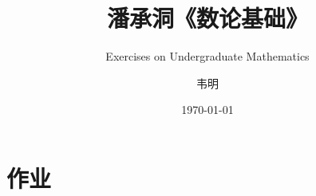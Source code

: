 \documentclass[12pt,lang=cn,thmcnt=subsection,pad]{elegantbook}
\title{潘承洞《数论基础》}
\subtitle{Exercises on Undergraduate Mathematics}
\author{韦明}
\date{\today}
\numberwithin{equation}{section}
\begin{document}
\maketitle
\frontmatter
%

\tableofcontents

\mainmatter
\chapter{作业}
%

\end{document}
